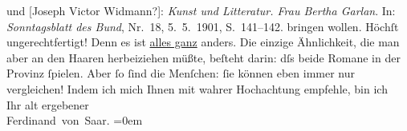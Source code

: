 \begin{ledgroupsized}[t]{13cm}
{{{                  und [Joseph Victor Widmann?]: \emph{Kunst und Litteratur. Frau Bertha Garlan}. In:
                        \emph{Sonntagsblatt des Bund}, Nr. 18,
                        5. 5. 1901, S. 141–142.}}}\label{K_L01130_1h} bringen wollen. Höchſt
               ungerechtfertigt! Denn es ist \uline{alles ganz} anders. Die
               einzige Ähnlichkeit, die man aber an den Haaren herbeiziehen müßte, beſteht darin:
               dſs beide Romane in der Provinz ſpielen. Aber ſo ſind die Menſchen: ſie können eben
               immer nur vergleichen! \pend
           \pstart
           Indem ich mich Ihnen mit wahrer Hochachtung empfehle, bin ich{\\[\baselineskip]}Ihr alt ergebener{\\[\baselineskip]}\spacefill\mbox{Ferdinand von Saar.}\pend
           \leftskip=0em{}\endnumbering{}\end{ledgroupsized}  \newcommand{\dateiname}{L01130}\newcommand{\titel}{Ferdinand von Saar an Arthur Schnitzler, 19. 6. 1901}\newcommand{\editorInnen}{Martin Anton Müller und Gerd-Hermann Susen}
      